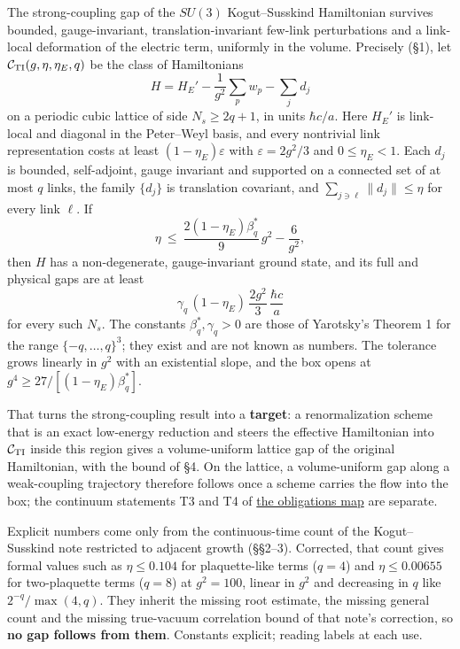 \documentclass[11pt,a4paper]{article}
\begin{document}
The strong-coupling gap of the \(SU(3)\) Kogut--Susskind Hamiltonian
survives bounded, gauge-invariant, translation-invariant few-link
perturbations and a link-local deformation of the electric term,
uniformly in the volume. Precisely (§1), let
\(\mathcal C_{\rm TI}(g,\eta,\eta_E,q)\) be the class of Hamiltonians
\[H=H_E'-\frac1{g^2}\sum_pw_p-\sum_jd_j\] on a periodic cubic lattice of
side \(N_s\ge2q+1\), in units \(\hbar c/a\). Here \(H_E'\) is link-local
and diagonal in the Peter--Weyl basis, and every nontrivial link
representation costs at least \((1-\eta_E)\varepsilon\) with
\(\varepsilon=2g^2/3\) and \(0\le\eta_E<1\). Each \(d_j\) is bounded,
self-adjoint, gauge invariant and supported on a connected set of at
most \(q\) links, the family \(\{d_j\}\) is translation covariant, and
\(\sum_{j\ni\ell}\|d_j\|\le\eta\) for every link \(\ell\). If
\[\eta\ \le\ \frac{2(1-\eta_E)\beta^*_q}{9}\,g^2-\frac6{g^2},\] then
\(H\) has a non-degenerate, gauge-invariant ground state, and its full
and physical gaps are at least
\[\gamma_q\,(1-\eta_E)\,\frac{2g^2}3\,\frac{\hbar c}a\] for every such
\(N_s\). The constants \(\beta^*_q,\gamma_q>0\) are those of Yarotsky's
Theorem 1 for the range \(\{-q,\dots,q\}^3\); they exist and are not
known as numbers. The tolerance grows linearly in \(g^2\) with an
existential slope, and the box opens at
\(g^4\ge27/[(1-\eta_E)\beta^*_q]\).

That turns the strong-coupling result into a \textbf{target}: a
renormalization scheme that is an exact low-energy reduction and steers
the effective Hamiltonian into \(\mathcal C_{\rm TI}\) inside this
region gives a volume-uniform lattice gap of the original Hamiltonian,
with the bound of §4. On the lattice, a volume-uniform gap along a
weak-coupling trajectory therefore follows once a scheme carries the
flow into the box; the continuum statements T3 and T4 of
\href{mass-gap-obligations-lattice.md}{the obligations map} are
separate.

Explicit numbers come only from the continuous-time count of the
Kogut--Susskind note restricted to adjacent growth (§§2--3). Corrected,
that count gives formal values such as \(\eta\le0.104\) for
plaquette-like terms (\(q=4\)) and \(\eta\le0.00655\) for two-plaquette
terms (\(q=8\)) at \(g^2=100\), linear in \(g^2\) and decreasing in
\(q\) like \(2^{-q}/\max(4,q)\). They inherit the missing root estimate,
the missing general count and the missing true-vacuum correlation bound
of that note's correction, so \textbf{no gap follows from them}.
Constants explicit; reading labels at each use.
\end{document}
